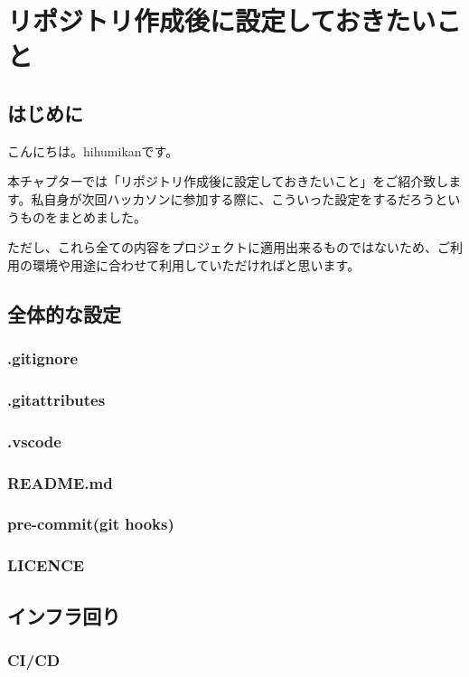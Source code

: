 \chapter{リポジトリ作成後に設定しておきたいこと}
\section{はじめに}
こんにちは。hihumikanです。

本チャプターでは「リポジトリ作成後に設定しておきたいこと」をご紹介致します。私自身が次回ハッカソンに参加する際に、こういった設定をするだろうというものをまとめました。

ただし、これら全ての内容をプロジェクトに適用出来るものではないため、ご利用の環境や用途に合わせて利用していただければと思います。

\section{全体的な設定}


\subsection{.gitignore}
\subsection{.gitattributes}
\subsection{.vscode}
\subsection{README.md}
\subsection{pre-commit(git hooks)}
\subsection{LICENCE}

\section{インフラ回り}

\subsection{CI/CD}
